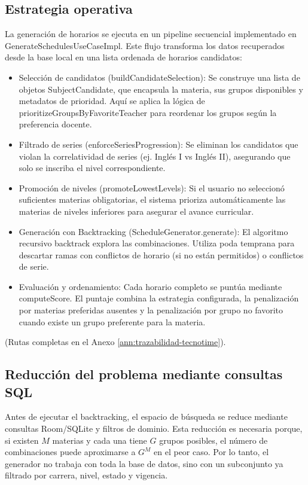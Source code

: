 \subsection{Estrategia operativa}
La generación de horarios se ejecuta en un pipeline secuencial implementado en GenerateSchedulesUseCaseImpl. Este flujo transforma los datos recuperados desde la base local en una lista ordenada de horarios candidatos:

\begin{itemize}
\item Selección de candidatos (buildCandidateSelection): Se construye una lista de objetos SubjectCandidate, que encapsula la materia, sus grupos disponibles y metadatos de prioridad. Aquí se aplica la lógica de prioritizeGroupsByFavoriteTeacher para reordenar los grupos según la preferencia docente.
\item Filtrado de series (enforceSeriesProgression): Se eliminan los candidatos que violan la correlatividad de series (ej. Inglés I vs Inglés II), asegurando que solo se inscriba el nivel correspondiente.
\item Promoción de niveles (promoteLowestLevels): Si el usuario no seleccionó suficientes materias obligatorias, el sistema prioriza automáticamente las materias de niveles inferiores para asegurar el avance curricular.
\item Generación con Backtracking (ScheduleGenerator.generate): El algoritmo recursivo backtrack explora las combinaciones. Utiliza poda temprana para descartar ramas con conflictos de horario (si no están permitidos) o conflictos de serie.
\item Evaluación y ordenamiento: Cada horario completo se puntúa mediante computeScore. El puntaje combina la estrategia configurada, la penalización por materias preferidas ausentes y la penalización por grupo no favorito cuando existe un grupo preferente para la materia.
\end{itemize}
(Rutas completas en el Anexo \ref{ann:trazabilidad-tecnotime}).

\subsection{Reducción del problema mediante consultas SQL}
Antes de ejecutar el backtracking, el espacio de búsqueda se reduce mediante consultas Room/SQLite y filtros de dominio. Esta reducción es necesaria porque, si existen \(M\) materias y cada una tiene \(G\) grupos posibles, el número de combinaciones puede aproximarse a \(G^M\) en el peor caso. Por lo tanto, el generador no trabaja con toda la base de datos, sino con un subconjunto ya filtrado por carrera, nivel, estado y vigencia.


